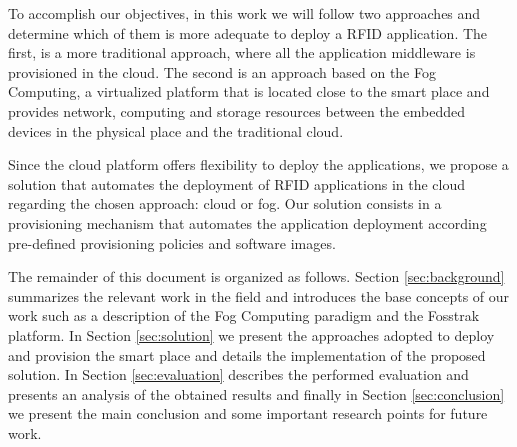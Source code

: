 To accomplish our objectives, in this work we will follow two approaches and determine which of them
is more adequate to deploy a \gls{RFID} application. The first, is a more traditional approach, where
all the application middleware is provisioned in the cloud. The second is an approach based on the Fog
Computing\cite{bonomi2012fog}, a virtualized platform that is located close to the smart place and
provides network, computing and storage resources between the embedded devices in the physical place
and the traditional cloud.

Since the cloud platform offers flexibility to deploy the applications, we propose a solution that
automates the deployment of \gls{RFID} applications in the cloud regarding the chosen approach:
cloud or fog. Our solution consists in a provisioning mechanism that automates the application
deployment according pre-defined provisioning policies and software images.

The remainder of this document is organized as follows. Section \ref{sec:background} summarizes the
relevant work in the field and introduces the base concepts of our work such as a description of the
Fog Computing paradigm and the Fosstrak platform. In Section \ref{sec:solution} we present the
approaches adopted to deploy and provision the smart place and details the implementation
of the proposed solution. In Section \ref{sec:evaluation} describes the performed evaluation and
presents an analysis of the obtained results and finally in Section \ref{sec:conclusion} we present
the main conclusion and some important research points for future work.
